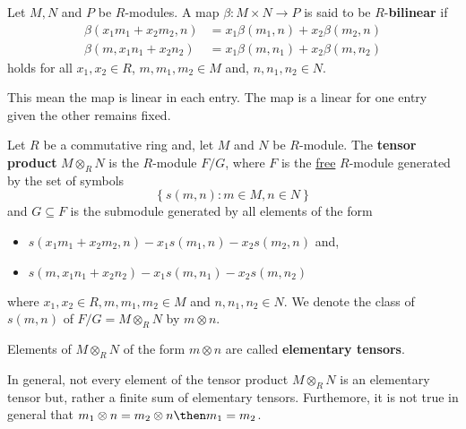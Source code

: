 \documentclass[12pt, a4paper]{article}
\begin{document}
\begin{definition}
    Let \(M,N\) and \(P\) be \(R\)-modules. A map \(\beta : M\times N \to P\) is said to be \(R\)-\textbf{bilinear} if
    \[\begin{aligned}
        \beta(x_1m_1 + x_2m_2, n) &= x_1\beta(m_1, n) + x_2\beta(m_2, n) \\
        \beta(m, x_1n_1 + x_2n_2) &= x_1\beta(m, n_1) + x_2\beta(m, n_2)
    \end{aligned}\]
    holds for all \(x_1,x_2 \in R\), \(m,m_1,m_2 \in M\) and, \(n,n_1,n_2 \in N\).
\end{definition}

\begin{mdnote}
    This mean the map is linear in each entry. The map is a linear for one entry given the other remains fixed.
\end{mdnote}

\begin{definition}
    Let \(R\) be a commutative ring and, let \(M\) and \(N\) be \(R\)-module. The \textbf{tensor product} \(M \otimes_R N\) is the \(R\)-module \(F/G\), where \(F\) is the \ul{free} \(R\)-module generated by the set of symbols 
    \[\left\{ s(m,n) : m\in M,n\in N \right\}\]
    and \(G \subseteq F\) is the submodule generated by all elements of the form 
    \begin{itemize}
        \item \(s(x_1m_1+x_2m_2,n)-x_1s(m_1,n)-x_2s(m_2,n)\) and,
        \item \(s(m,x_1n_1+x_2n_2)-x_1s(m,n_1)-x_2s(m,n_2)\)
    \end{itemize}
    where \(x_1,x_2 \in R, m,m_1,m_2 \in M\) and \(n,n_1,n_2 \in N\). We denote the class of \(s(m,n)\) of \(F/G=M\otimes_R N\) by \(m\otimes n\).
\end{definition}

\begin{definition}
    Elements of \(M \otimes_R N\) of the form \(m\otimes n\) are called \textbf{elementary tensors}. 
\end{definition}

\begin{mdremark}
    In general, not every element of the tensor product \(M \otimes_R N\) is an elementary tensor but, rather a finite sum of elementary tensors. Furthemore, it is not true in general that \(m_1 \otimes n =m_2 \otimes n \then m_1 =m_2\).
\end{mdremark}
\end{document}
